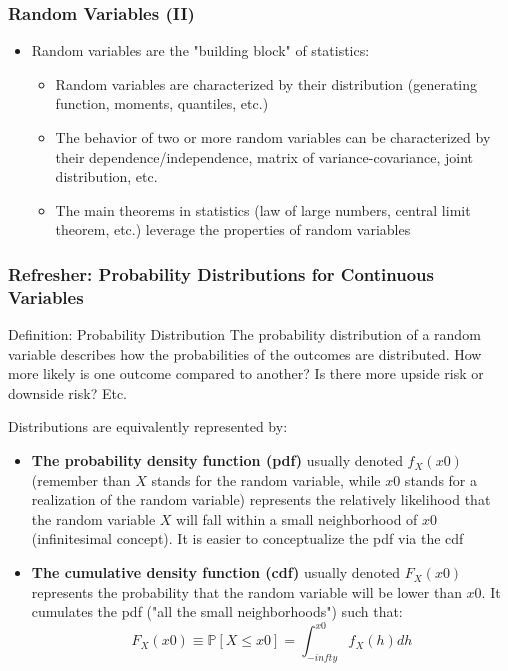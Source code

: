 \documentclass{beamer}
\begin{document}
\begin{frame}
  \frametitle{Random Variables (II)}    
  \begin{itemize}
  \item Random variables are the "building block" of statistics:
    \begin{itemize}
    \item Random variables are characterized by their distribution (generating
      function, moments, quantiles, etc.)
    \item The behavior of two or more random variables can be characterized by
      their dependence/independence, matrix of variance-covariance, joint
      distribution, etc.
    \item The main theorems in statistics (law of large numbers, central limit
      theorem, etc.) leverage the properties of random variables
    \end{itemize}
  \end{itemize}
\end{frame}


\begin{frame}
  \frametitle{Refresher: Probability Distributions for Continuous Variables}
  
  \begin{block}{Definition: Probability Distribution}
    The probability distribution of a random variable describes how the probabilities of the outcomes are distributed. How more likely is one outcome compared to another? Is there more upside risk or downside risk? Etc.
  \end{block}

  Distributions are equivalently represented by:

  \begin{itemize}
  \item \textbf{The probability density function (pdf)} usually denoted $f_X(x0)$ (remember than $X$ stands for the random variable, while $x0$ stands for a realization of the random variable) represents the relatively likelihood that the random variable $X$ will fall within a small neighborhood of $x0$ (infinitesimal concept). It is easier to conceptualize the pdf via the cdf
  \item \textbf{The cumulative density function (cdf)} usually denoted $F_X(x0)$ represents the probability that the random variable will be lower than $x0$. It cumulates the pdf ("all the small neighborhoods") such that:
    \begin{equation*}
F_X(x0) \equiv \mathbb{P}[X \leq x0] = \int_{-infty}^{x0} f_X(h) dh      
    \end{equation*}    
  \end{itemize}
  
\end{frame}
\end{document}
